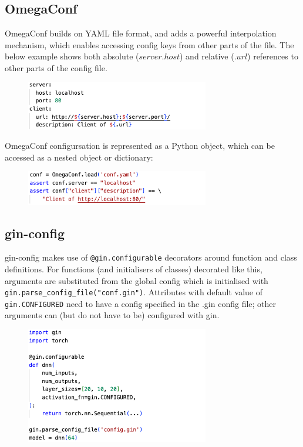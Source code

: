 \documentclass{itatnew}
\begin{document}
\subsection{OmegaConf}

OmegaConf builds on YAML file format, and adds a powerful interpolation mechanism, which enables accessing config keys from other parts of the file. The below example shows both absolute (\texttt{${server.host}$}) and relative (\texttt{${.url}$}) references to other parts of the config file.

\begin{figure}[H]
    \centering
    \includegraphics[width=8cm]{o1.png}
\end{figure}

OmegaConf configursation is represented as a Python object, which can be accessed as a nested object or dictionary:

\begin{figure}[H]
    \centering
    \includegraphics[width=8cm]{o2.png}
\end{figure}

\subsection{gin-config}
gin-config makes use of \texttt{@gin.configurable} decorators around function and class definitions. For functions (and initialisers of classes) decorated like this, arguments are substituted from the global config which is initialised with \texttt{gin.parse_config_file("conf.gin")}. Attributes with default value of \texttt{gin.CONFIGURED} need to have a config specified in the .gin config file; other arguments can (but do not have to be) configured with gin.

\begin{figure}[H]
    \centering
    \includegraphics[width=8cm]{g1.png}
\end{figure}
\end{document}
